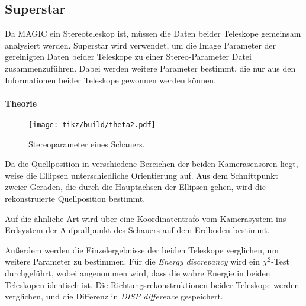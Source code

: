 \subsection{Superstar}%
\label{sub:superstar}

Da MAGIC ein Stereoteleskop ist,
müssen die Daten beider Teleskope gemeinsam analysiert werden.
Superstar wird verwendet,
um die Image Parameter der gereinigten Daten beider
Teleskope zu einer Stereo-Parameter Datei zusammenzuführen.
Dabei werden weitere Parameter bestimmt,
die nur aus den Informationen beider Teleskope gewonnen werden können.

\paragraph{Theorie}%

\begin{wrapfigure}[15]{o}{0.4\textwidth}
  \centering
  \texttt{[image: tikz/build/theta2.pdf]}
  \caption{Stereoparameter eines Schauers.}%
  \label{fig:reco}
\end{wrapfigure}

Da die Quellposition in verschiedene Bereichen der beiden Kamerasensoren
liegt,
weise die Ellipsen unterschiedliche Orientierung auf.
Aus dem Schnittpunkt zweier Geraden,
die durch die Hauptachsen der Ellipsen gehen,
wird die rekonstruierte Quellposition bestimmt.

Auf die ähnliche Art wird über eine Koordinatentrafo vom Kamerasystem ins
Erdsystem der Aufprallpunkt des Schauers auf dem Erdboden
bestimmt.


Außerdem werden die Einzelergebnisse der beiden Teleskope verglichen,
um weitere Parameter zu bestimmen.
Für die \textit{Energy discrepancy} wird
ein $\chi^2$-Test durchgeführt,
wobei angenommen wird,
dass die wahre Energie in beiden Teleskopen identisch ist.
Die Richtungsrekonstruktionen beider Teleskope werden verglichen,
und die Differenz in \textit{DISP difference} gespeichert.
